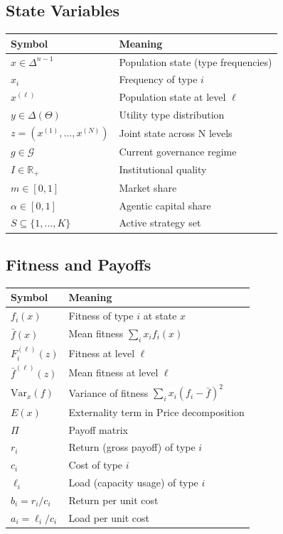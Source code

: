 \documentclass[12pt]{article}
\newcommand{\R}{\mathbb{R}}
\newcommand{\Var}{\mathrm{Var}}
\begin{document}
\subsection{State Variables}

\begin{tabular}{ll}
\toprule
\textbf{Symbol} & \textbf{Meaning} \\
\midrule
$x \in \Delta^{n-1}$ & Population state (type frequencies) \\
$x_i$ & Frequency of type $i$ \\
$x^{(\ell)}$ & Population state at level $\ell$ \\
$y \in \Delta(\Theta)$ & Utility type distribution \\
$z = (x^{(1)}, \ldots, x^{(N)})$ & Joint state across N levels \\
$g \in \mathcal{G}$ & Current governance regime \\
$I \in \R_+$ & Institutional quality \\
$m \in [0, 1]$ & Market share \\
$\alpha \in [0, 1]$ & Agentic capital share \\
$S \subseteq \{1, \ldots, K\}$ & Active strategy set \\
\bottomrule
\end{tabular}

\subsection{Fitness and Payoffs}

\begin{tabular}{ll}
\toprule
\textbf{Symbol} & \textbf{Meaning} \\
\midrule
$f_i(x)$ & Fitness of type $i$ at state $x$ \\
$\bar{f}(x)$ & Mean fitness $\sum_i x_i f_i(x)$ \\
$F^{(\ell)}_i(z)$ & Fitness at level $\ell$ \\
$\bar{f}^{(\ell)}(z)$ & Mean fitness at level $\ell$ \\
$\Var_x(f)$ & Variance of fitness $\sum_i x_i (f_i - \bar{f})^2$ \\
$E(x)$ & Externality term in Price decomposition \\
$\Pi$ & Payoff matrix \\
$r_i$ & Return (gross payoff) of type $i$ \\
$c_i$ & Cost of type $i$ \\
$\ell_i$ & Load (capacity usage) of type $i$ \\
$b_i = r_i / c_i$ & Return per unit cost \\
$a_i = \ell_i / c_i$ & Load per unit cost \\
\bottomrule
\end{tabular}
\end{document}
